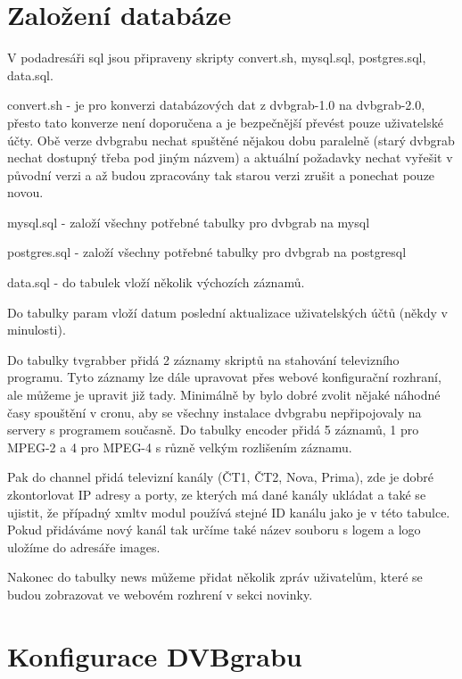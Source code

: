 \section{Založení databáze}

\vspace{10pt}

V podadresáři sql jsou připraveny skripty convert.sh, mysql.sql, postgres.sql, data.sql.

convert.sh - je pro konverzi databázových dat z dvbgrab-1.0 na dvbgrab-2.0, přesto tato konverze není doporučena a je bezpečnější převést pouze uživatelské účty. Obě verze dvbgrabu nechat spuštěné nějakou dobu paralelně (starý dvbgrab nechat dostupný třeba pod jiným názvem) a aktuální požadavky nechat vyřešit v původní verzi a až budou zpracovány tak starou verzi zrušit a ponechat pouze novou.

mysql.sql - založí všechny potřebné tabulky pro dvbgrab na mysql

postgres.sql - založí všechny potřebné tabulky pro dvbgrab na postgresql

data.sql - do tabulek vloží několik výchozích záznamů. 

Do tabulky param vloží datum poslední aktualizace uživatelských účtů (někdy v minulosti). 

Do tabulky tvgrabber přidá 2 záznamy skriptů na stahování televizního programu. Tyto záznamy lze dále upravovat přes webové konfigurační rozhraní, ale můžeme je upravit již tady. Minimálně by bylo dobré zvolit nějaké náhodné časy spouštění v cronu, aby se všechny instalace dvbgrabu nepřipojovaly na servery s programem současně. Do tabulky encoder přidá 5 záznamů, 1 pro MPEG-2 a 4 pro MPEG-4 s různě velkým rozlišením záznamu. 

Pak do channel přidá televizní kanály (ČT1, ČT2, Nova, Prima), zde je dobré zkontorlovat IP adresy a porty, ze kterých má dané kanály ukládat a také se ujistit, že případný xmltv modul používá stejné ID kanálu jako je v této tabulce. Pokud přidáváme nový kanál tak určíme také název souboru s logem a logo uložíme do adresáře images.

Nakonec do tabulky news můžeme přidat několik zpráv uživatelům, které se budou zobrazovat ve webovém rozhrení v sekci novinky.

\vspace{10pt}

\section{Konfigurace DVBgrabu}

